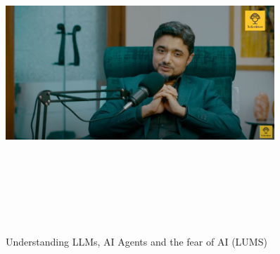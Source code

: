 \documentclass[a4paper,12pt]{article}
\begin{document}
\vspace{40pt} %
\begin{figure}[h]
	\centering
	\vspace{-10pt} %
	\includegraphics[width=0.9\textwidth, height=12cm, keepaspectratio]{../Talks Blogs/Understanding LLMs, AI Agents and the fear of AI}
	\vspace{-5pt} %
	\caption{Understanding LLMs, AI Agents and the fear of AI (LUMS)}
	\vspace{-10pt}
\end{figure}
\end{document}
